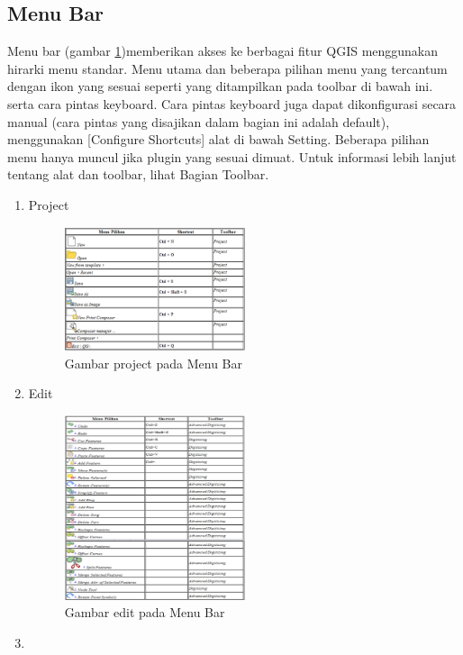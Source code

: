 \subsection{Menu Bar}
Menu bar (gambar \ref{menubar})memberikan akses ke berbagai fitur QGIS menggunakan hirarki menu standar. Menu utama dan beberapa pilihan menu yang tercantum dengan ikon yang sesuai seperti yang ditampilkan pada toolbar di bawah ini. serta cara pintas keyboard. Cara pintas keyboard juga dapat dikonfigurasi secara manual (cara pintas yang disajikan dalam bagian ini adalah default), menggunakan [Configure Shortcuts] alat di bawah Setting. Beberapa pilihan menu hanya muncul jika plugin yang sesuai dimuat. Untuk informasi lebih lanjut tentang alat dan toolbar, lihat Bagian Toolbar. 
\begin{enumerate}
\item
Project
\begin{figure}[ht]
    \centerline{\includegraphics[width=0.5\textwidth]{figures/menubar}}
    \caption{Gambar project pada Menu Bar}
    \label{menubar}
    \end{figure}
\item
Edit
\begin{figure}[ht]
    \centerline{\includegraphics[width=0.5\textwidth]{figures/menubar1}}
    \caption{Gambar edit pada Menu Bar}
    \label{menubar1}
    \end{figure}
\item

\end{enumerate}
